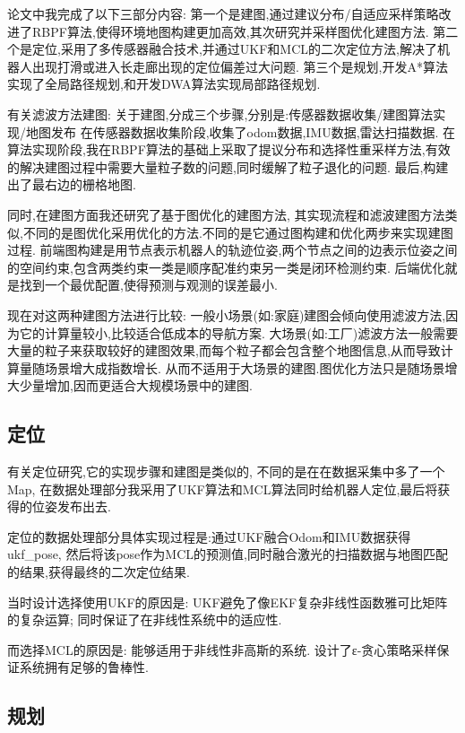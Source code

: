 论文中我完成了以下三部分内容:
第一个是建图,通过建议分布/自适应采样策略改进了RBPF算法,使得环境地图构建更加高效,其次研究并采样图优化建图方法.
第二个是定位,采用了多传感器融合技术,并通过UKF和MCL的二次定位方法,解决了机器人出现打滑或进入长走廊出现的定位偏差过大问题.
第三个是规划,开发A*算法实现了全局路径规划,和开发DWA算法实现局部路径规划.

有关滤波方法建图:
关于建图,分成三个步骤,分别是:传感器数据收集/建图算法实现/地图发布
在传感器数据收集阶段,收集了odom数据,IMU数据,雷达扫描数据.
在算法实现阶段,我在RBPF算法的基础上采取了提议分布和选择性重采样方法,有效的解决建图过程中需要大量粒子数的问题,同时缓解了粒子退化的问题.
最后,构建出了最右边的栅格地图.

同时,在建图方面我还研究了基于图优化的建图方法,
其实现流程和滤波建图方法类似,不同的是图优化采用优化的方法.不同的是它通过图构建和优化两步来实现建图过程.
前端图构建是用节点表示机器人的轨迹位姿,两个节点之间的边表示位姿之间的空间约束,包含两类约束一类是顺序配准约束另一类是闭环检测约束.
后端优化就是找到一个最优配置,使得预测与观测的误差最小.

现在对这两种建图方法进行比较:
一般小场景(如:家庭)建图会倾向使用滤波方法,因为它的计算量较小,比较适合低成本的导航方案.
大场景(如:工厂)滤波方法一般需要大量的粒子来获取较好的建图效果,而每个粒子都会包含整个地图信息,从而导致计算量随场景增大成指数增长.
从而不适用于大场景的建图.图优化方法只是随场景增大少量增加,因而更适合大规模场景中的建图.

\subsection{定位}

有关定位研究,它的实现步骤和建图是类似的,
不同的是在在数据采集中多了一个Map,
在数据处理部分我采用了UKF算法和MCL算法同时给机器人定位,最后将获得的位姿发布出去.

定位的数据处理部分具体实现过程是:通过UKF融合Odom和IMU数据获得ukf\_pose,
然后将该pose作为MCL的预测值,同时融合激光的扫描数据与地图匹配的结果,获得最终的二次定位结果.

当时设计选择使用UKF的原因是:
UKF避免了像EKF复杂非线性函数雅可比矩阵的复杂运算;
同时保证了在非线性系统中的适应性.

而选择MCL的原因是:
能够适用于非线性非高斯的系统.
设计了ε-贪心策略采样保证系统拥有足够的鲁棒性.

\subsection{规划}

